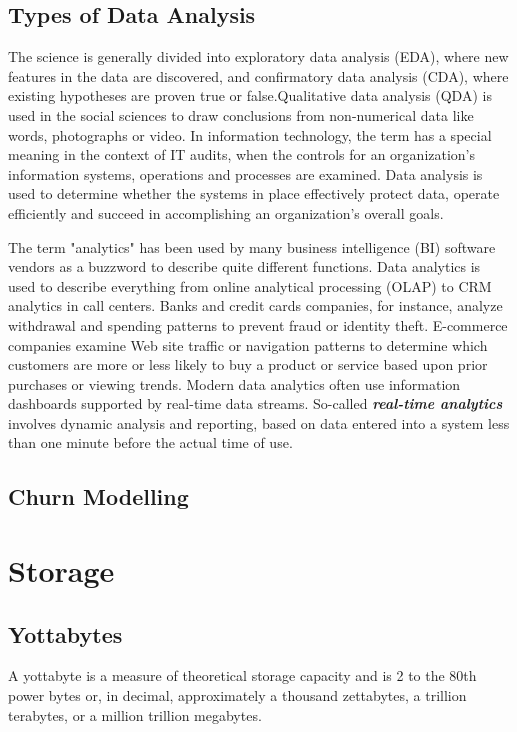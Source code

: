 
\subsection{Types of Data Analysis}
The science is generally divided into exploratory data analysis (EDA), where new features in the data are discovered, and confirmatory data analysis (CDA), where existing hypotheses are proven true or false.Qualitative data analysis (QDA) is used in the social sciences to draw conclusions from non-numerical data like words, photographs or video. In information technology, the term has a special meaning in the context of IT audits, when the controls for an organization's information systems, operations and processes are examined. Data analysis is used to determine whether the systems in place effectively protect data, operate efficiently and succeed in accomplishing an organization's overall goals.

The term "analytics" has been used by many business intelligence (BI) software vendors as a buzzword to describe quite different functions. Data analytics is used to describe everything from online analytical processing (OLAP) to CRM analytics in call centers. Banks and credit cards companies, for instance, analyze withdrawal and spending patterns to prevent fraud or identity theft. E-commerce companies examine Web site traffic or navigation patterns to determine which customers are more or less likely to buy a product or service based upon prior purchases or viewing trends. Modern data analytics often use information dashboards supported by real-time data streams. So-called \textbf{\emph{real-time analytics}} involves dynamic analysis and reporting, based on data entered into a system less than one minute before the actual time of use.


\subsection{Churn Modelling }

\section{Storage}
\subsection{Yottabytes}
A yottabyte is a measure of theoretical storage capacity and is 2 to the 80th power bytes or, in decimal, approximately a thousand zettabytes, a trillion terabytes, or a million trillion megabytes.


